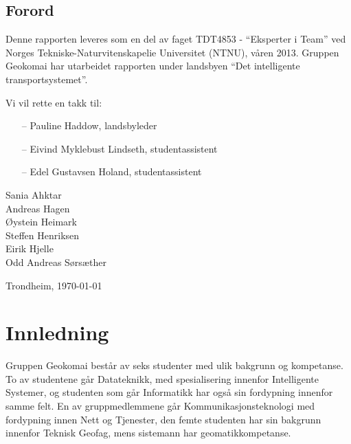 \documentclass[a4paper,norsk,oneside]{book}
\newcommand{\thesisAuthor}{Sania Ahktar\\Andreas Hagen\\Øystein Heimark\\Steffen Henriksen\\Eirik Hjelle\\Odd Andreas Sørsæther}
\begin{document}



\clearpage

\section*{Forord}



\vspace{1cm}

Denne rapporten leveres som en del av faget TDT4853 - “Eksperter i Team” ved Norges Tekniske-Naturvitenskapelie Universitet (NTNU), våren 2013. Gruppen Geokomai har utarbeidet rapporten under landsbyen “Det intelligente transportsystemet”. 

Vi vil rette en takk til:
\begin{itemize}	
\item[--] Pauline Haddow, landsbyleder
\item[--] Eivind Myklebust Lindseth, studentassistent
\item[--] Edel Gustavsen Holand, studentassistent
\end {itemize}




\vfill

\noindent
\thesisAuthor

\hfill Trondheim, \today

\cleardoublepage

\tableofcontents

\listoffigures


\mainmatter

\chapter{Innledning}
\label{cha:Introduction}
Gruppen Geokomai består av seks studenter med ulik bakgrunn og kompetanse. To av studentene går Datateknikk, med spesialisering innenfor Intelligente Systemer, og studenten som går Informatikk har også sin fordypning innenfor samme felt. En av gruppmedlemmene 
går Kommunikasjonsteknologi med fordypning innen Nett og Tjenester, den femte studenten har sin bakgrunn innenfor Teknisk Geofag, mens sistemann har geomatikkompetanse. 
\end{document}
